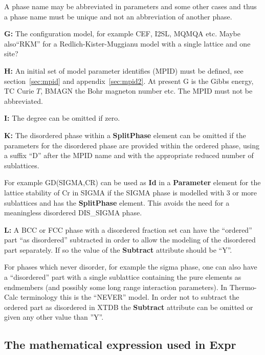 \documentclass{article}
\begin{document}
\begin{description}
  A phase name may be abbreviated in parameters and some other cases
  and thus a phase name must be unique and not an abbreviation of
  another phase.

\item{\bf G:} The configuration model, for example CEF, I2SL, MQMQA
  etc.  Maybe also``RKM'' for a Redlich-Kister-Muggianu model with a
  single lattice and one site?

\item{\bf H:} An initial set of model parameter identifies (MPID) must
  be defined, see section~\ref{sec:mpid} and appendix~\ref{sec:mpid2}.
  At present G is the Gibbs energy, TC Curie $T$, BMAGN the Bohr
  magneton number etc.  The MPID must not be abbreviated.

\item{\bf I:} The degree can be omitted if zero.

\item{\bf K:} The disordered phase within a {\bf SplitPhase} element
  can be omitted if the parameters for the disordered phase are
  provided within the ordered phase, using a suffix ``D'' after the
  MPID name and with the appropriate reduced number of sublattices.
  
  For example GD(SIGMA,CR) can be used as {\bf Id} in a {\bf
    Parameter} element for the lattice stability of Cr in SIGMA if the
  SIGMA phase is modelled with 3 or more sublattices and has the {\bf
    SplitPhase} element.  This avoids the need for a meaningless
  disordered DIS\_SIGMA phase.

\item{\bf L:} A BCC or FCC phase with a disordered fraction set can
  have the ``ordered'' part ``as disordered'' subtracted in order to
  allow the modeling of the disordered part separately.  If so the
  value of the {\bf Subtract} attribute should be ``Y''.

  For phases which never disorder, for example the sigma phase, one
  can also have a ``disordered'' part with a single sublattice
  containing the pure elements as endmembers (and possibly some long
  range interaction parameters).  In Thermo-Calc terminology this is
  the ``NEVER'' model.  In order not to subtract the ordered part as
  disordered in XTDB the {\bf Subtract} attribute can be omitted or
  given any other value than ''Y''.

\end{description}

\subsection{The mathematical expression used in Expr}\label{sec:expr}
\end{document}
